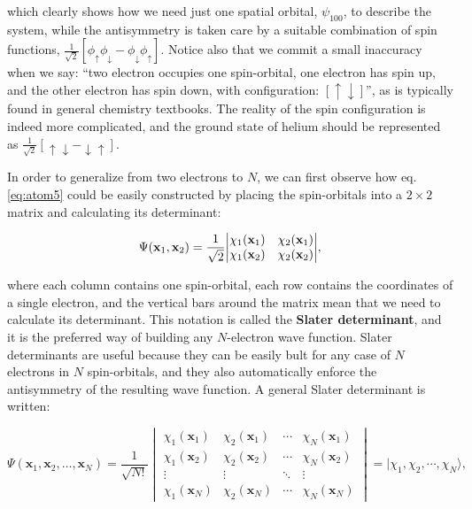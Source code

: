 \documentclass[
  9pt,
]{extbook}
\theoremstyle{definition}
\theoremstyle{definition}
\theoremstyle{definition}
\theoremstyle{remark}
\begin{document}
which clearly shows how we need just one spatial orbital, \(\psi_{100}\), to describe the system, while the antisymmetry is taken care by a suitable combination of spin functions, \(\frac{1}{\sqrt{2}} \left[ \phi_{\uparrow}\phi_{\downarrow} - \phi_{\downarrow}\phi_{\uparrow} \right]\). Notice also that we commit a small inaccuracy when we say: ``two electron occupies one spin-orbital, one electron has spin up, and the other electron has spin down, with configuration: \([\uparrow\downarrow]\)'', as is typically found in general chemistry textbooks. The reality of the spin configuration is indeed more complicated, and the ground state of helium should be represented as \(\frac{1}{\sqrt{2}}\left[\uparrow\downarrow-\downarrow\uparrow\right]\).

In order to generalize from two electrons to \(N\), we can first observe how eq. \eqref{eq:atom5} could be easily constructed by placing the spin-orbitals into a \(2\times2\) matrix and calculating its determinant:

\begin{equation}
\Psi({\bf x}_1, {\bf x}_2)= \frac{1}{\sqrt{2}}{\begin{vmatrix} \chi_1({\bf x}_1)&\chi_2({\bf x}_1)\\\chi_1({\bf x}_2)&\chi_2({\bf x}_2)
\end{vmatrix}},
\label{eq:atom7}
\end{equation}

where each column contains one spin-orbital, each row contains the coordinates of a single electron, and the vertical bars around the matrix mean that we need to calculate its determinant. This notation is called the \textbf{Slater determinant}, and it is the preferred way of building any \(N\)-electron wave function. Slater determinants are useful because they can be easily bult for any case of \(N\) electrons in \(N\) spin-orbitals, and they also automatically enforce the antisymmetry of the resulting wave function. A general Slater determinant is written:

\begin{equation}
\Psi (\mathbf{x} _{1},\mathbf{x} _{2},\ldots ,\mathbf{x} _{N})={\frac {1}{\sqrt {N!}}}{\begin{vmatrix}\chi _{1}(\mathbf{x} _{1})&\chi _{2}(\mathbf{x} _{1})&\cdots &\chi _{N}(\mathbf{x} _{1})\\\chi _{1}(\mathbf{x} _{2})&\chi _{2}(\mathbf{x} _{2})&\cdots &\chi _{N}(\mathbf{x} _{2})\\\vdots &\vdots &\ddots &\vdots \\\chi _{1}(\mathbf{x} _{N})&\chi _{2}(\mathbf{x} _{N})&\cdots &\chi _{N}(\mathbf{x} _{N})\end{vmatrix}} = |\chi _{1},\chi _{2},\cdots ,\chi _{N}\rangle,
\label{eq:atom8}
\end{equation}
\end{document}
